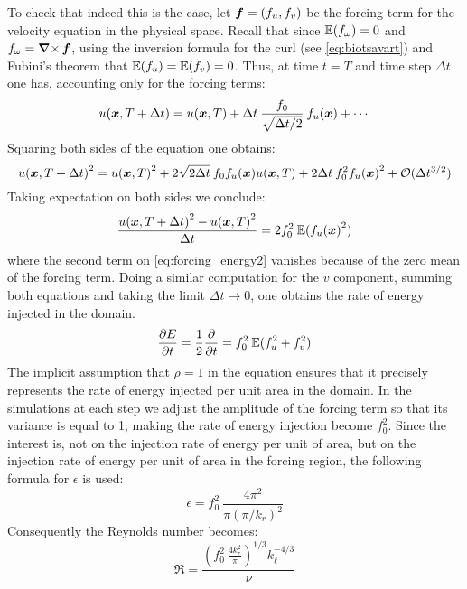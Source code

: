 \documentclass[../main.tex]{subfiles}
\begin{document}
To check that indeed this is the case, let $\boldsymbol{f}=(f_u,f_v)$ be the forcing term for the velocity equation in the physical space. Recall that since $\mathbb{E}(f_\omega)=0$ and $f_\omega = \operatorname{\boldsymbol{\nabla}\times} \boldsymbol{f}$, using the inversion formula for the curl (see \cref{eq:biotsavart}) and Fubini's theorem that $\mathbb{E}(f_u) = \mathbb{E}(f_v) = 0$. Thus, at time $t=T$ and time step $\Delta t$ one has, accounting only for the forcing terms:
\begin{equation}
	u(\boldsymbol{x},T+\Delta t) = u(\boldsymbol{x},T) + \Delta t \:\frac{f_0}{\sqrt{\Delta t/2}}\: f_u(\boldsymbol{x}) + \cdots
\end{equation}
Squaring both sides of the equation one obtains:
\begin{equation}\label{eq:forcing_energy2}
	{u(\boldsymbol{x},T+\Delta t)}^2 = {u(\boldsymbol{x},T)}^2 + 2\sqrt{2\Delta t}\: f_0 f_u(\boldsymbol{x}) u(\boldsymbol{x},T) +2 \Delta t \: f_0^2 {f_u(\boldsymbol{x})}^2 + \mathcal{O}(\Delta t^{3/2})
\end{equation}
Taking expectation on both sides we conclude:
\begin{equation}
	\frac{{u(\boldsymbol{x},T+\Delta t)}^2 - {u(\boldsymbol{x},T)}^2}{\Delta t} = 2f_0^2\: \mathbb{E}({f_u(\boldsymbol{x})}^2)
\end{equation}
where the second term on \cref{eq:forcing_energy2} vanishes because of the zero mean of the forcing term. Doing a similar computation for the $v$ component, summing both equations and taking the limit $\Delta t \to 0$, one obtains the rate of energy injected in the domain.
\begin{equation}
	\pdv{E}{t}=\frac{1}{2}\pdv{}{t}(u^2 + v^2) = f_0^2\: \mathbb{E}(f_u^2 + f_v^2)
\end{equation}
The implicit assumption that $\rho=1$ in the equation ensures that it precisely represents the rate of energy injected per unit area in the domain. In the simulations at each step we adjust the amplitude of the forcing term so that its variance is equal to 1, making the rate of energy injection become $f_0^2$. Since the interest is, not on the injection rate of energy per unit of area, but on the injection rate of energy per unit of area in the forcing region, the following formula for $\epsilon$ is used:
\begin{equation}\label{eq:epsilon}
	\epsilon = f_0^2\: \frac{4 \pi^2}{\pi {(\pi / k_r)}^2}
\end{equation}
Consequently the Reynolds number becomes:
\begin{equation}\label{eq:reynolds}
	\Re = \frac{{\left( f_0^2\:\frac{4 k_r^2}{\pi} \right)}^{1/3} k_\ell^{-4/3}}{\nu}
\end{equation}
\end{document}
